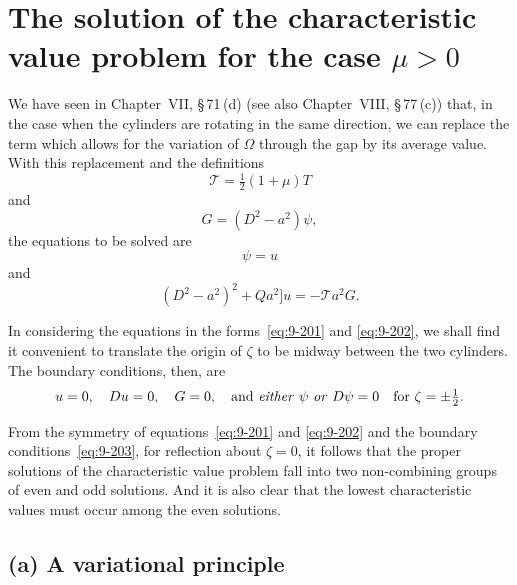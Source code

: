 \section{The solution of the characteristic value problem for the case $\mu > 0$}
\label{sec:86}

We have seen in Chapter~VII, \S\,71\,(d) (see also Chapter~VIII, \S\,77\,(c)) that, in the case when the cylinders are rotating in the same direction, we can replace the term which allows for the variation of $\Omega$ through the gap by its average value. With this replacement and the definitions
\begin{equation}
\mathscr{T} = \tfrac{1}{2}(1+\mu)T \label{eq:9-199}
\end{equation}
and
\begin{equation}
G = (D^2 - a^2)\psi, \label{eq:9-200}
\end{equation}
the equations to be solved are
\begin{equation}
[(D^2 - a^2)^2 + Qa^2]\psi = u \label{eq:9-201}
\end{equation}
and
\begin{equation}
(D^2 - a^2)^2 + Qa^2]u = -\mathscr{T} a^2 G. \label{eq:9-202}
\end{equation}

In considering the equations in the forms~\eqref{eq:9-201} and \eqref{eq:9-202}, we shall find it convenient to translate the origin of $\zeta$ to be midway between the two cylinders. The boundary conditions, then, are
\begin{equation}
u = 0, \quad Du = 0, \quad G = 0, \quad \text{and \emph{either} } \psi \text{ \emph{or} } D\psi = 0 \quad \text{for } \zeta = \pm\tfrac{1}{2}. \label{eq:9-203}
\end{equation}

From the symmetry of equations~\eqref{eq:9-201} and \eqref{eq:9-202} and the boundary conditions~\eqref{eq:9-203}, for reflection about $\zeta = 0$, it follows that the proper solutions of the characteristic value problem fall into two non-combining groups of even and odd solutions. And it is also clear that the lowest characteristic values must occur among the even solutions.

\subsection*{(a) A variational principle}

